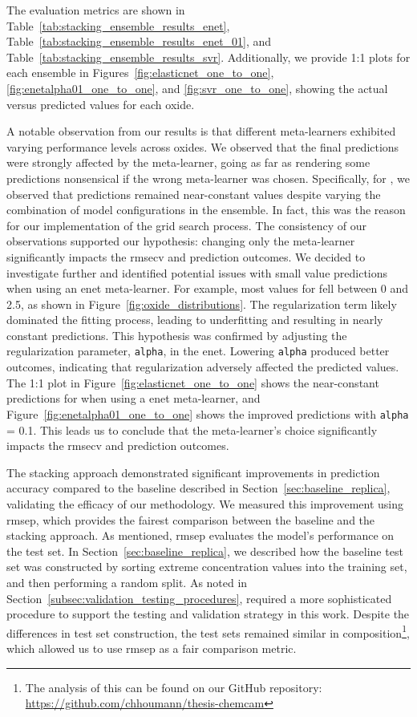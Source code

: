 The evaluation metrics are shown in Table~\ref{tab:stacking_ensemble_results_enet}, Table~\ref{tab:stacking_ensemble_results_enet_01}, and Table~\ref{tab:stacking_ensemble_results_svr}.
Additionally, we provide 1:1 plots for each ensemble in Figures~\ref{fig:elasticnet_one_to_one}, \ref{fig:enetalpha01_one_to_one}, and \ref{fig:svr_one_to_one}, showing the actual versus predicted values for each oxide.

A notable observation from our results is that different meta-learners exhibited varying performance levels across oxides.
We observed that the final predictions were strongly affected by the meta-learner, going as far as rendering some predictions nonsensical if the wrong meta-learner was chosen.
Specifically, for , we observed that predictions remained near-constant values despite varying the combination of model configurations in the  ensemble.
In fact, this was the reason for our implementation of the grid search process.
The consistency of our observations supported our hypothesis: changing only the meta-learner significantly impacts the \gls{rmsecv} and prediction outcomes.
We decided to investigate further and identified potential issues with small value predictions when using an \gls{enet} meta-learner.
For example, most values for  fell between 0 and 2.5, as shown in Figure~\ref{fig:oxide_distributions}.
The regularization term likely dominated the fitting process, leading to underfitting and resulting in nearly constant predictions.
This hypothesis was confirmed by adjusting the regularization parameter, \texttt{alpha}, in the \gls{enet}.
Lowering \texttt{alpha} produced better outcomes, indicating that regularization adversely affected the predicted values.
The 1:1 plot in Figure~\ref{fig:elasticnet_one_to_one} shows the near-constant predictions for  when using a \gls{enet} meta-learner, and Figure~\ref{fig:enetalpha01_one_to_one} shows the improved predictions with \texttt{alpha} = 0.1.
This leads us to conclude that the meta-learner's choice significantly impacts the \gls{rmsecv} and prediction outcomes.

The stacking approach demonstrated significant improvements in prediction accuracy compared to the baseline described in Section~\ref{sec:baseline_replica}, validating the efficacy of our methodology.
We measured this improvement using \gls{rmsep}, which provides the fairest comparison between the baseline and the stacking approach.
As mentioned, \gls{rmsep} evaluates the model's performance on the test set.
In Section~\ref{sec:baseline_replica}, we described how the baseline test set was constructed by sorting extreme concentration values into the training set, and then performing a random split.
As noted in Section~\ref{subsec:validation_testing_procedures}, required a more sophisticated procedure to support the testing and validation strategy in this work.
Despite the differences in test set construction, the test sets remained similar in composition\footnote{The analysis of this can be found on our GitHub repository: \url{https://github.com/chhoumann/thesis-chemcam}}, which allowed us to use \gls{rmsep} as a fair comparison metric.

